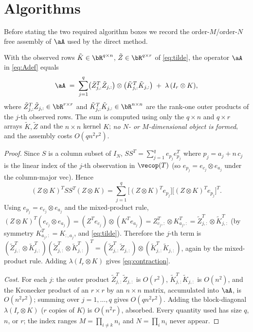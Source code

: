 \section*{Algorithms}

Before stating the two required algorithm boxes we record the order-$M$/order-$N$
free assembly of $\aA$ used by the direct method.

\begin{lemma}\label{lem:assembly}
With the observed rows $\tilde K\in\bR^{q\times n}$, $\tilde Z\in\bR^{q\times r}$
of \eqref{eq:tilde}, the operator $\aA$ in \eqref{eq:Adef} equals
\begin{equation}\label{eq:contraction}
  \aA
  \;=\;\sum_{j=1}^{q}\bigl(\tilde Z_{j,:}^{T}\tilde Z_{j,:}\bigr)\otimes
        \bigl(\tilde K_{j,:}^{T}\tilde K_{j,:}\bigr)
      \;+\;\lambda\,(I_r\otimes K),
\end{equation}
where $\tilde Z_{j,:}^{T}\tilde Z_{j,:}\in\bR^{r\times r}$ and
$\tilde K_{j,:}^{T}\tilde K_{j,:}\in\bR^{n\times n}$ are the rank-one outer
products of the $j$-th observed rows. The sum is computed using only the
$q\times n$ and $q\times r$ arrays $\tilde K,\tilde Z$ and the $n\times n$ kernel
$K$; \emph{no $N$- or $M$-dimensional object is formed}, and the assembly costs
$O(qn^{2}r^{2})$.
\end{lemma}

\begin{proof}
Since $S$ is a column subset of $I_N$, $SS^{T}=\sum_{j=1}^{q}e_{p_j}e_{p_j}^{T}$
where $p_j=a_j+n\,c_j$ is the linear index of the $j$-th observation in
$\vecop(T)$ (so $e_{p_j}=e_{c_j}\otimes e_{a_j}$ under the column-major vec).
Hence
\[
  (Z\otimes K)^{T}SS^{T}(Z\otimes K)
  =\sum_{j=1}^{q}\bigl[(Z\otimes K)^{T}e_{p_j}\bigr]\bigl[(Z\otimes K)^{T}e_{p_j}\bigr]^{T}.
\]
Using $e_{p_j}=e_{c_j}\otimes e_{a_j}$ and the mixed-product rule,
$(Z\otimes K)^{T}(e_{c_j}\otimes e_{a_j})=(Z^{T}e_{c_j})\otimes(K^{T}e_{a_j})
=Z_{c_j,:}^{T}\otimes K_{a_j,:}^{T}=\tilde Z_{j,:}^{T}\otimes\tilde K_{j,:}^{T}$
(by symmetry $K_{a_j,:}^{T}=K_{:,a_j}$, and \eqref{eq:tilde}). Therefore the
$j$-th term is
$(\tilde Z_{j,:}^{T}\otimes\tilde K_{j,:}^{T})(\tilde Z_{j,:}^{T}\otimes\tilde K_{j,:}^{T})^{T}
=(\tilde Z_{j,:}^{T}\tilde Z_{j,:})\otimes(\tilde K_{j,:}^{T}\tilde K_{j,:})$,
again by the mixed-product rule. Adding $\lambda(I_r\otimes K)$ gives
\eqref{eq:contraction}.

\emph{Cost.} For each $j$: the outer product $\tilde Z_{j,:}^{T}\tilde Z_{j,:}$
is $O(r^{2})$, $\tilde K_{j,:}^{T}\tilde K_{j,:}$ is $O(n^{2})$, and the
Kronecker product of an $r\times r$ by an $n\times n$ matrix, accumulated into
$\aA$, is $O(n^{2}r^{2})$; summing over $j=1,\dots,q$ gives $O(qn^{2}r^{2})$.
Adding the block-diagonal $\lambda(I_r\otimes K)$ ($r$ copies of $K$) is
$O(n^{2}r)$, absorbed. Every quantity used has size $q$, $n$, or $r$; the index
ranges $M=\prod_{i\neq k}n_i$ and $N=\prod_i n_i$ never appear.
\end{proof}

